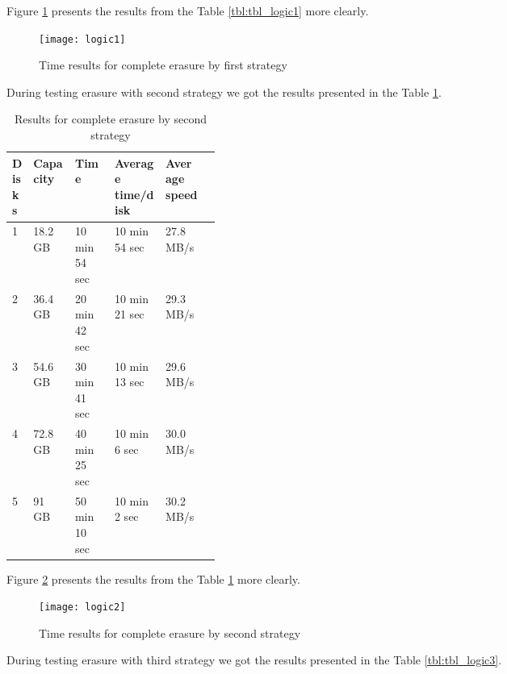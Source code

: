 Figure \ref{fig:logic1} presents the results from the Table \ref{tbl:tbl_logic1} more clearly.

\begin{figure}[h!]
\begin{center}
  \texttt{[image: logic1]}
\end{center}
  \caption{Time results for complete erasure by first strategy}
  \label{fig:logic1}
\end{figure}


\newpage

During testing erasure with second strategy we got the results presented in the Table \ref{tbl:tbl_logic2}. 


\begin{table}[h!]
  \caption{Results for complete erasure by second strategy}
  \begin{center}
  \begin{tabularx}{\textwidth}{|p{0.1\linewidth}|p{0.2\linewidth}|X|X|X|X|}
    \hline
    Disks & Capacity & Time & Average time/disk & Average speed
    \\ \hline
    1 & 18.2 GB & 10 min 54 sec & 10 min 54 sec & 27.8 MB/s \\ \hline    
    2 & 36.4 GB & 20 min 42 sec & 10 min 21 sec & 29.3 MB/s \\ \hline
    3 & 54.6 GB & 30 min 41 sec & 10 min 13 sec & 29.6 MB/s \\ \hline
    4 & 72.8 GB & 40 min 25 sec & 10 min 6 sec  & 30.0 MB/s \\ \hline
    5 & 91 GB   & 50 min 10 sec & 10 min 2 sec  & 30.2 MB/s \\ \hline
  \end{tabularx}
  \label{tbl:tbl_logic2}
  \end{center}
\end{table}
Figure \ref{fig:logic2} presents the results from the Table \ref{tbl:tbl_logic2} more clearly.
\begin{figure}[h!]
\begin{center}
  \texttt{[image: logic2]}
\end{center}
  \caption{Time results for complete erasure by second strategy}
  \label{fig:logic2}
\end{figure}


\newpage
During testing erasure with third strategy we got the results presented in the Table \ref{tbl:tbl_logic3}. 


